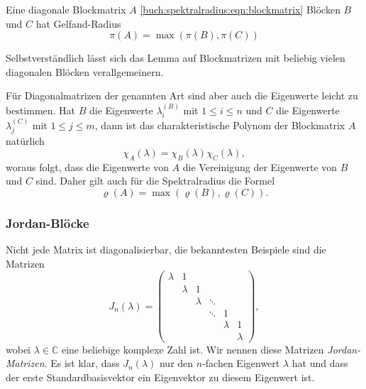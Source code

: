 \begin{lemma}
\label{buch:spektralradius:lemma:diagonalbloecke}
Eine diagonale Blockmatrix $A$ \eqref{buch:spektralradius:eqn:blockmatrix}
Blöcken $B$ und $C$  hat Gelfand-Radius
\[
\pi(A) = \max ( \pi(B), \pi(C) )
\]
\end{lemma}

Selbstverständlich lässt sich das Lemma auf Blockmatrizen mit beliebig
vielen diagonalen Blöcken verallgemeinern.
%

Für Diagonalmatrizen der genannten Art sind aber auch die 
Eigenwerte leicht zu bestimmen.
%
Hat $B$ die Eigenwerte $\lambda_i^{(B)}$ mit $1\le i\le n$ und $C$ die
Eigenwerte $\lambda_j^{(C)}$ mit $1\le j\le m$, dann ist das charakteristische
Polynom der Blockmatrix $A$ natürlich
%
%
\[
\chi_A(\lambda) = \chi_B(\lambda)\chi_C(\lambda),
\]
woraus folgt, dass die Eigenwerte von $A$ die Vereinigung der Eigenwerte
von $B$ und $C$ sind.
Daher gilt auch für die Spektralradius die Formel
\[
\varrho(A) = \max(\varrho(B) , \varrho(C)).
\]

\subsubsection{Jordan-Blöcke}
%
Nicht jede Matrix ist diagonalisierbar, die bekanntesten Beispiele sind
die Matrizen
\begin{equation}
J_n(\lambda)
=
\begin{pmatrix}
\lambda &      1&       &       &       &       \\
        &\lambda&      1&       &       &       \\[-5pt]
        &       &\lambda&\ddots &       &       \\[-5pt]
        &       &       &\ddots &      1&       \\
        &       &       &       &\lambda&      1\\
        &       &       &       &       &\lambda
\end{pmatrix},
\label{buch:spektralradius:eqn:jordan}
\end{equation}
wobei $\lambda\in\mathbb C$ eine beliebige komplexe Zahl ist.
Wir nennen diese Matrizen {\em Jordan-Matrizen}.
Es ist klar, dass $J_n(\lambda)$ nur den $n$-fachen Eigenwert
$\lambda$ hat und dass der erste Standardbasisvektor ein
Eigenvektor zu diesem Eigenwert ist.

